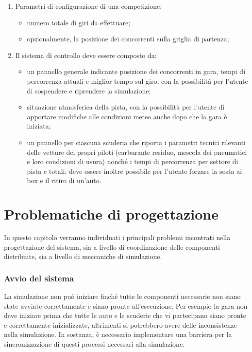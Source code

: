 \documentclass[a4paper]{report}
\begin{document}
\begin{enumerate}
\item Parametri di configurazione di una competizione:
	\begin{itemize}
	\item numero totale di giri da effettuare;
	\item opzionalmente, la posizione dei concorrenti sulla griglia di partenza;
	\end{itemize}
\item Il sistema di controllo deve essere composto da:
	\begin{itemize}
	\item un pannello generale indicante posizione dei concorrenti in gara, tempi di percorrenza attuali e miglior tempo sul giro, con la possibilità per l'utente di sospendere e riprendere la simulazione;
	\item situazione atmosferica della pista, con la possibilità per l'utente di apportare modifiche alle condizioni meteo anche dopo che la gara è iniziata;
	\item un pannello per ciascuna scuderia che riporta i parametri tecnici rilevanti delle vetture dei propri piloti (carburante residuo, mescola dei pneumatici e loro condizioni di usura) nonché i tempi di percorrenza per settore di pista e totali; deve essere inoltre possibile per l'utente forzare la sosta ai box e il ritiro di un'auto.
	\end{itemize}
\end{enumerate}


\chapter{Problematiche di progettazione}

In questo capitolo verranno individuati i principali problemi incontrati nella progettazione del sistema, sia a livello di coordinazione delle componenti distribuite, sia a livello di meccaniche di simulazione.

\subsection*{Avvio del sistema}
La simulazione non può iniziare finché tutte le componenti necessarie non siano state avviate correttamente e siano pronte all'esecuzione. Per esempio la gara non deve iniziare prima che tutte le auto e le scuderie che vi partecipano siano pronte e correttamente inizializzate, altrimenti si potrebbero avere delle inconsistenze nella simulazione. In sostanza, è necessario implementare una barriera per la sincronizzazione di questi processi necessari alla simulazione.
\end{document}
